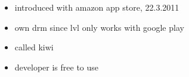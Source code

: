 \begin{itemize}
  \item introduced with amazon app store, 22.3.2011
  \item own drm since lvl only works with google play
  \item called kiwi
  \item developer is free to use
\end{itemize}
